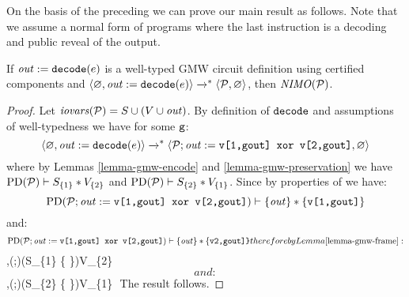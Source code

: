 On the basis of the preceding we can prove our main result as
follows. Note that we assume a normal form of programs where the last
instruction is a decoding and public reveal of the output.
\begin{theorem}
  \label{theorem-gmw-NIMO}
  If $\eassign{\outv}{\ttt{decode}(e)}$ is a well-typed GMW circuit
  definition using certified components and
  $\config{\varnothing}{\eassign{\outv}{\ttt{decode}(e)}} \redxs
  \config{\prog}{\varnothing}$, then $\NIMO(\prog)$.
\end{theorem}
\begin{proof}
  Let $\iov(\prog) = S \cup (V \cup \outv)$. By definition of $\ttt{decode}$
  and assumptions of well-typedness we have for some $\ttt{g}$:
  $$
  \config{\varnothing}{\eassign{\outv}{\ttt{decode}(e)}} \redxs
  \config{\prog;\eassign{\outv}{\ttt{v[1,gout] xor v[2,gout]}}}{\varnothing}
  $$
  where by Lemmas \ref{lemma-gmw-encode} and \ref{lemma-gmw-preservation} we
  have $\sep{\progd(\prog)}{S_{\{1\}}}{V_{\{2\}}}$ and
  $\sep{\progd(\prog)}{S_{\{2\}}}{V_{\{1\}}}$. Since by properties of  we have:
  $$
  \sep{\progd(\prog;\eassign{\outv}{\ttt{v[1,gout] xor v[2,gout]}})}{\{\outv\}}{\{\ttt{v[1,gout]}\}}
  $$
  and:
  $$
  \sep{\progd(\prog;\eassign{\outv}{\ttt{v[1,gout] xor v[2,gout]}})}{\{\outv\}}{\{\ttt{v2,gout]\}}
  $$
  therefore by Lemma \ref{lemma-gmw-frame}}:
    
  $$
  \sep{\progd(\prog;)}{(S_{\{1\}} \cup \{ \outv \})}{V_{\{2\}}}
  $$
  and:
  $$
  \sep{\progd(\prog;)}{(S_{\{2\}} \cup \{ \outv \})}{V_{\{1\}}}
  $$
  The result follows.
\end{proof}

